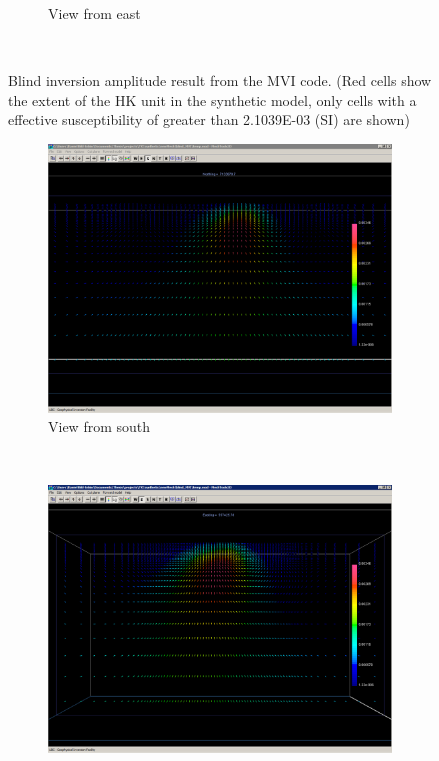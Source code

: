 \begin{figure}
\begin{subfigure}[b]{0.8\textwidth}
        \caption{View from east}
        \label{fig:blindMVIeast}
    \end{subfigure}
    ~ %
   \caption{Blind inversion amplitude result from the \ac{MVI} code. (Red cells show the extent of the HK unit in the synthetic model, only cells with a effective susceptibility of greater than 2.1039E-03 (SI) are shown)}
   \label{fig:blindMVI}
\end{figure}

\begin{figure}
    \centering
    \begin{subfigure}[b]{0.8\textwidth}
        \includegraphics[width=\textwidth]{images/TKC/blindMVIsouthFld.PNG}
        \caption{View from south}
        \label{fig:blindMVIsouthFld}
    \end{subfigure}
    ~ %
    \begin{subfigure}[b]{0.8\textwidth}
        \includegraphics[width=\textwidth]{images/TKC/blindMVIeastFld.PNG}

\end{subfigure}
\end{figure}
